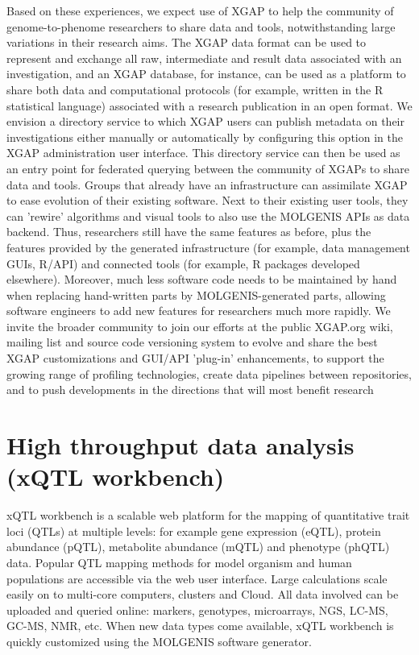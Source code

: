 \documentclass[8pt, twoside, a5paper]{report}
\begin{document}
Based on these experiences, we expect use of XGAP to help the community of genome-to-phenome researchers to share data and tools, notwithstanding large variations 
in their research aims. The XGAP data format can be used to represent and exchange all raw, intermediate and result data associated with an investigation, and an 
XGAP database, for instance, can be used as a platform to share both data and computational protocols (for example, written in the R statistical language) associated 
with a research publication in an open format. We envision a directory service to which XGAP users can publish metadata on their investigations either manually or 
automatically by configuring this option in the XGAP administration user interface. This directory service can then be used as an entry point for federated querying 
between the community of XGAPs to share data and tools. Groups that already have an infrastructure can assimilate XGAP to ease evolution of their existing software.
Next to their existing user tools, they can 'rewire' algorithms and visual tools to also use the MOLGENIS APIs as data backend. Thus, researchers still have the
same features as before, plus the features provided by the generated infrastructure (for example, data management GUIs, R/API) and connected tools (for example, R
packages developed elsewhere). Moreover, much less software code needs to be maintained by hand when replacing hand-written parts by MOLGENIS-generated parts, 
allowing software engineers to add new features for researchers much more rapidly. We invite the broader community to join our efforts at the public XGAP.org wiki, 
mailing list and source code versioning system to evolve and share the best XGAP customizations and GUI/API 'plug-in' enhancements, to support the growing range 
of profiling technologies, create data pipelines between repositories, and to push developments in the directions that will most benefit research

\section{High throughput data analysis (xQTL workbench)}
xQTL workbench is a scalable web platform for the mapping of quantitative trait loci (QTLs) at multiple levels: 
for example gene expression (eQTL), protein abundance (pQTL), metabolite abundance (mQTL) and phenotype (phQTL) data. 
Popular QTL mapping methods for model organism and human populations are accessible via the web user interface. 
Large calculations scale easily on to multi-core computers, clusters and Cloud. All data involved can be uploaded 
and queried online: markers, genotypes, microarrays, NGS, LC-MS, GC-MS, NMR, etc. When new data types come available, 
xQTL workbench is quickly customized using the MOLGENIS software generator.
\end{document}
